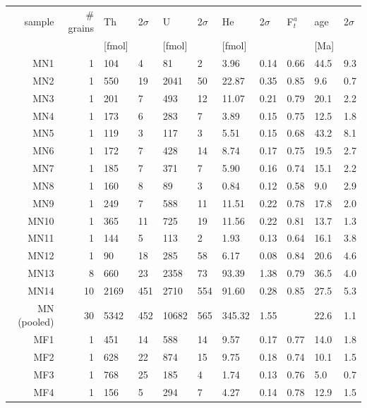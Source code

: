 \documentclass{article}
\begin{document}
\begin{table}[here]
  \centering
\begin{tabular}{rrlllllllll}
    sample & \# grains &  Th  &  2$\sigma$ &  U   &  2$\sigma$ & He   &  2$\sigma$ &  F$_t^a$ & age  &  2$\sigma$ \\
   ~   &  & [fmol] & & [fmol] & & [fmol] & & & [Ma] & ~  \\
\hline
\hline
  MN1 & 1 & 104 & 4 & 81 & 2 & 3.96 & 0.14 & 0.66 & 44.5 & 9.3 \\
  MN2 & 1 & 550 & 19 & 2041 & 50 & 22.87 & 0.35 & 0.85 & 9.6 & 0.7 \\
  MN3 & 1 & 201 & 7 & 493 & 12 & 11.07 & 0.21 & 0.79 & 20.1 & 2.2 \\
  MN4 & 1 & 173 & 6 & 283 & 7 & 3.89 & 0.15 & 0.75 & 12.5 & 1.8 \\
  MN5 & 1 & 119 & 3 & 117 & 3 & 5.51 & 0.15 & 0.68 & 43.2 & 8.1 \\
  MN6 & 1 & 172 & 7 & 428 & 14 & 8.74 & 0.17 & 0.75 & 19.5 & 2.7 \\
  MN7 & 1 & 185 & 7 & 371 & 7 & 5.90 & 0.16 & 0.74 & 15.1 & 2.2 \\
  MN8 & 1 & 160 & 8 & 89 & 3 & 0.84 & 0.12 & 0.58 & 9.0 & 2.9 \\
  MN9 & 1 & 249 & 7 & 588 & 11 & 11.51 & 0.22 & 0.78 & 17.8 & 2.0 \\
 MN10 & 1 & 365 & 11 & 725 & 19 & 11.56 & 0.22 & 0.81 & 13.7 & 1.3 \\
 MN11 & 1 & 144 & 5 & 113 & 2 & 1.93 & 0.13 & 0.64 & 16.1 & 3.8 \\
 MN12 & 1 & 90 & 18 & 285 & 58 & 6.17 & 0.08 & 0.84 & 20.6 & 4.6 \\
 MN13 & 8 & 660 & 23 & 2358 & 73 & 93.39 & 1.38 & 0.79 & 36.5 & 4.0 \\
 MN14 & 10 & 2169 & 451 & 2710 & 554 & 91.60 & 0.28 & 0.85 & 27.5 & 5.3 \\
\hline
MN (pooled) & 30 & 5342 & 452 & 10682 & 565 &  345.32 & 1.55 & & 22.6 & 1.1 \\
\hline
\hline
  MF1 & 1 & 451 & 14 & 588 & 14 & 9.57 & 0.17 & 0.77 & 14.0 & 1.8 \\
  MF2 & 1 & 628 & 22 & 874 & 15 & 9.75 & 0.18 & 0.74 & 10.1 & 1.5 \\
  MF3 & 1 & 768 & 25 & 185 & 4 & 1.74 & 0.13 & 0.76 & 5.0 & 0.7 \\
  MF4 & 1 & 156 & 5 & 294 & 7 & 4.27 & 0.14 & 0.78 & 12.9 & 1.5 \\

\end{tabular}
\end{table}
\end{document}
